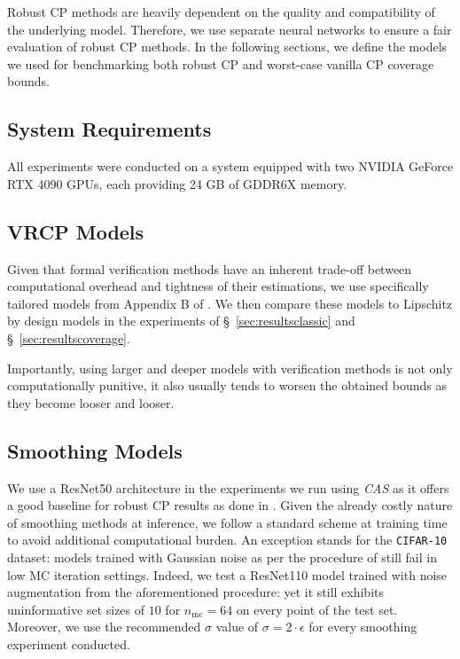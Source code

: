 Robust CP methods are heavily dependent on the quality and compatibility of the underlying model. Therefore, we use separate neural networks to ensure a fair evaluation of robust CP methods. In the following sections, we define the models we used for benchmarking both robust CP and worst-case vanilla CP coverage bounds.

\subsection{System Requirements}

All experiments were conducted on a system equipped with two NVIDIA GeForce RTX 4090 GPUs, each providing 24 GB of GDDR6X memory.

\subsection{VRCP Models}

Given that formal verification methods have an inherent trade-off between computational overhead and tightness of their estimations, we use specifically tailored models from Appendix B of \citet{vrcp}. We then compare these models to Lipschitz by design models in the experiments of \S~\ref{sec:resultsclassic} and \S~\ref{sec:resultscoverage}.

Importantly, using larger and deeper models with verification methods is not only computationally punitive, it also usually tends to worsen the obtained bounds as they become looser and looser.

\subsection{Smoothing Models}

We use a ResNet50 architecture in the experiments we run using \emph{CAS} as it offers a good baseline for robust CP results as done in \cite{cas}. Given the already costly nature of smoothing methods at inference, we follow a standard scheme at training time to avoid additional computational burden. An exception stands for the \texttt{CIFAR-10} dataset: models trained with Gaussian noise as per the procedure of \citet{salman2020provablyrobustdeeplearning} still fail in low MC iteration settings. Indeed, we test a ResNet110 model trained with noise augmentation from the aforementioned procedure: yet it still exhibits uninformative set sizes of $10$ for $n_\mathrm{mc}=64$ on every point of the test set. Moreover, we use the recommended $\sigma$ value of $\sigma = 2\cdot \epsilon$ for every smoothing experiment conducted.

